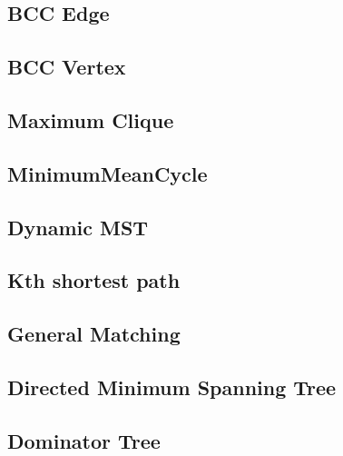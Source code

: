 \documentclass[a4paper,10pt,twocolumn,oneside]{article}
\begin{document}
\subsection{BCC Edge}


\subsection{BCC Vertex}


% 

\subsection{Maximum Clique}


\subsection{MinimumMeanCycle}


\subsection{Dynamic MST}


\subsection{Kth shortest path}


\subsection{General Matching}


\subsection{Directed Minimum Spanning Tree}


\subsection{Dominator Tree}

\end{document}
